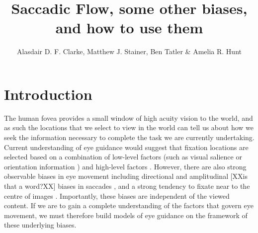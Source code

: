 \documentclass[a4paper, twocolumn, oneside, 10pt]{article}
\title{Saccadic Flow, some other biases, and how to use them}
\author{Alasdair D. F. Clarke, Matthew J. Stainer, Ben Tatler \& Amelia R. Hunt}
\begin{document}
\section{Introduction}

The human fovea provides a small window of high acuity vision to the world, and as such the locations that we select to view in the world can tell us about how we seek the information necessary to complete the task we are currently undertaking. Current understanding of eye guidance would suggest that fixation locations are selected based on a combination of low-level factors (such as visual salience \citep{itti-koch2000} or orientation information \citep{Baddeley:2006wq}) and high-level factors \citep{Yarbus:1967wd, Buswell:1935tf, Land:2001uc}. However, there are also strong observable biases in eye movement including directional and amplitudinal [XXis that a word?XX] biases in saccades \citep{Tatler:2008uu, Tatler:2009vp, Foulsham:2010fj}, and a strong tendency to fixate near to the centre of images \citep{Tatler:2007hk,Canosa:2003tu}. Importantly, these biases are independent of the viewed content. If we are to gain a complete understanding of the factors that govern eye movement, we must therefore build models of eye guidance on the framework of these underlying biases.
\end{document}
